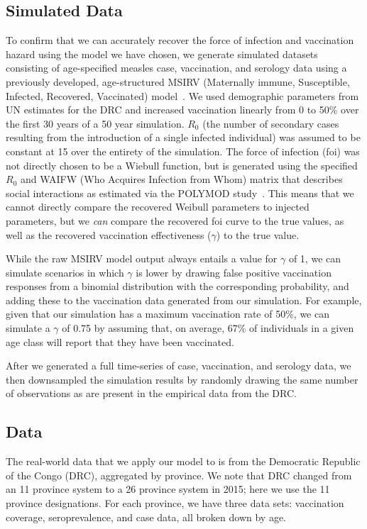 \documentclass[nofootinbib,aps,pre,twocolumn,superscriptaddress,showkeys,showpacs]{revtex4-1}
\begin{document}
\subsection{Simulated Data\label{subsec:SimData}}
To confirm that we can accurately recover the force of infection and vaccination hazard using the model we have chosen, we generate simulated datasets consisting of age-specified measles case, vaccination, and serology data using a previously developed, age-structured MSIRV (Maternally immune, Susceptible, Infected, Recovered, Vaccinated) model~\cite{Metcalf2012}. We used demographic parameters from UN estimates for the DRC and increased vaccination linearly from 0 to 50\% over the first 30 years of a 50 year simulation. $R_{0}$ (the number of secondary cases resulting from the introduction of a single infected individual) was assumed to be constant at 15 over the entirety of the simulation. The force of infection (foi) was not directly chosen to be a Wiebull function, but is generated using the specified $R_0$ and WAIFW (Who Acquires Infection from Whom) matrix that describes social interactions as estimated via the POLYMOD study~\cite{Polymod}. This means that we cannot directly compare the recovered Weibull parameters to injected parameters, but we \emph{can} compare the recovered foi curve to the true values, as well as the recovered vaccination effectiveness ($\gamma$) to the true value. 

While the raw MSIRV model output always entails a value for $\gamma$ of 1, we can simulate scenarios in which $\gamma$ is lower by drawing false positive vaccination responses from a binomial distribution with the corresponding probability, and adding these to the vaccination data generated from our simulation. For example, given that our simulation has a maximum vaccination rate of 50\%, we can simulate a $\gamma$ of 0.75 by assuming that, on average, 67\% of individuals in a given age class will report that they have been vaccinated.

After we generated a full time-series of case, vaccination, and serology data, we then downsampled the simulation results by randomly drawing the same number of observations as are present in the empirical data from the DRC.

\subsection{Data \label{subsec:Data}}
The real-world data that we apply our model to is from the Democratic Republic of the Congo (DRC), aggregated by province. We note that DRC changed from an 11 province system to a 26 province system in 2015; here we use the 11 province designations. For each province, we have three data sets: vaccination coverage, seroprevalence, and case data, all broken down by age. 
\end{document}

